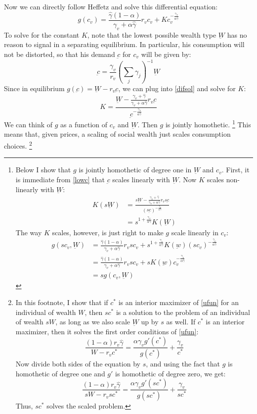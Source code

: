 \documentclass[12pt]{article}
\begin{document}
Now we can directly follow Heffetz and solve this differential equation:
\begin{equation}
	\label{difsol}
	g(c_v) = \frac{\hat{\gamma}\left(1-\alpha\right)}{\gamma_v +\alpha \hat{\gamma}} r_v c_v + K c_v^{-\frac{\gamma_v}{\alpha \hat{\gamma}}}
\end{equation}
To solve for the constant $K$, note that the lowest possible wealth type $\underbar{W}$ has no reason to signal in a separating equilibrium.
In particular, his consumption will not be distorted, so that his demand $\underbar{c}$ for $c_v$ will be given by:
\begin{equation}
	\label{lowc}
	\underbar{c} = \frac{\gamma_v}{r_v}\left(\sum_{j} \gamma_j\right)^{-1}\underbar{W} 
\end{equation}
Since in equilibrium $g(\underbar{c}) = \underbar{W} - r_v \underbar{c}$, we can plug into \eqref{difsol} and solve for $K$:
\[
K = \frac{\underbar{W}- \frac{\gamma_v + \hat{\gamma}}{\gamma_v + \alpha \hat{\gamma}}r_v \underbar{c}}{\underbar{c}^{-\frac{\gamma_v}{\alpha \hat{\gamma}}}}
\]
We can think of $g$ as a function of $c_v$ and $\underbar{W}$. 
Then $g$ is jointly homothetic.  
\footnote{
Below I show that $g$ is jointly homothetic of degree one in $\underbar{W}$ and $c_v$.  First, it is immediate from \eqref{lowc} that $\underbar{c}$ scales linearly with $\underbar{W}$.
Now $K$ scales non-linearly with $\underbar{W}$:
\begin{align*}
	K(s\underbar{W}) &= \frac{s\underbar{W}- \frac{\gamma_v + \hat{\gamma}}{\gamma_v + \alpha \hat{\gamma}}r_v s \underbar{c}}{(s\underbar{c})^{-\frac{\gamma_v}{\alpha \hat{\gamma}}}} \\
	&= s^{1 + \frac{\gamma_v}{\alpha \hat{\gamma}}}K(\underbar{W})
\end{align*}
The way $K$ scales, however, is just right to make $g$ scale linearly in $c_v$:
\begin{align*}
	g(s c_v,\underbar{W}) &= \frac{\hat{\gamma}\left(1-\alpha\right)}{\gamma_v +\alpha \hat{\gamma}} r_v s c_v + s^{1+\frac{\gamma_v}{\alpha \hat{\gamma}}} K(\underbar{w}) (s c_v)^{-\frac{\gamma_v}{\alpha \hat{\gamma}}} \\
	&= \frac{\hat{\gamma}\left(1-\alpha\right)}{\gamma_v +\alpha \hat{\gamma}} r_v s c_v + s K(\underbar{w}) c_v^{-\frac{\gamma_v}{\alpha \hat{\gamma}}} \\
	&= s g(c_v,\underbar{W})
\end{align*}
}
This means that, given prices, a scaling of social wealth just scales consumption choices.
\footnote{
In this footnote, I show that if $c^*$ is an interior maximizer of \eqref{ufun} for an individual of wealth $W$, then $s c^*$ is a solution to the  problem of an individual of wealth $s W$, as long as we also scale $\underbar{W}$ up by $s$ as well.
If $c^*$ is an interior maximizer, then it solves the first order conditions of \eqref{ufun}:
\[
\frac{(1-\alpha)r_v \hat{\gamma}}{W-r_v c^*} = \frac{\alpha \gamma_v g'(c^*)}{g(c^*)} + \frac{\gamma_v}{c^*}
\]
Now divide both sides of the equation by $s$, and using the fact that $g$ is homothetic of degree one and $g'$ is homothetic of degree zero, we get:
\[
\frac{(1-\alpha)r_v \hat{\gamma}}{s W-r_v s c^*} = \frac{\alpha \gamma_v g'(s c^*)}{g(s c^*)} + \frac{\gamma_v}{s c^*}
\]
Thus, $s c^*$ solves the scaled problem.
}
\end{document}
